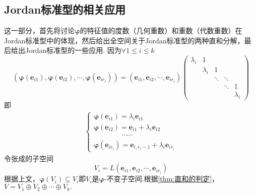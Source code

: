 \subsection{Jordan标准型的相关应用}
这一部分，首先将讨论$\bm{\varphi}$的特征值的度数（几何重数）和重数（代数重数）在Jordan标准型中的体现，然后给出全空间关于Jordan标准型的两种直和分解，最后给出Jordan标准型的一些应用.
因为$\forall 1\leqslant i\leqslant k$\[
    \left(
    \bm{\varphi}\left(\bm{e}_{i1}\right),\bm{\varphi}\left(\bm{e}_{i2}\right),\cdots,\bm{\varphi}\left(\bm{e}_{ir_i}\right)
    \right)=\left(
    \bm{e}_{i1},\bm{e}_{i2},\cdots,\bm{e}_{ir_i}
    \right)\begin{pmatrix}
        \lambda_i & 1         &        &        &           \\
                  & \lambda_i & 1      &                    \\
                  &           & \ddots & \ddots &           \\
                  &           &        & \ddots & 1         \\
                  &           &        &        & \lambda_i
    \end{pmatrix}
\]即\begin{align*}
    \begin{cases*}
        \bm{\varphi}\left(\bm{e}_{i1}\right)=\lambda_i\bm{e}_{i1}             \\
        \bm{\varphi}\left(\bm{e}_{i2}\right)=\bm{e}_{i1}+\lambda_i\bm{e}_{i2} \\
        \qquad\qquad\cdots\cdots                                              \\
        \bm{\varphi}\left(\bm{e}_{ir_i}\right)=\bm{e}_{i,r_i-1}+\lambda_i\bm{e}_{ir_i}
    \end{cases*}\tag{$*$}
\end{align*}令张成的子空间\[
    V_i=L\left(
    \bm{e}_{i1},\bm{e}_{i2},\cdots,\bm{e}_{ir_i}
    \right)
\]根据上文，$\bm{\varphi}\left(V_i\right)\subseteq V_i$即$V_i$是$\bm{\varphi}$-不变子空间.根据\cref{thm:直和的判定}，$V=V_1\oplus V_2\oplus\cdots\oplus V_k.$
